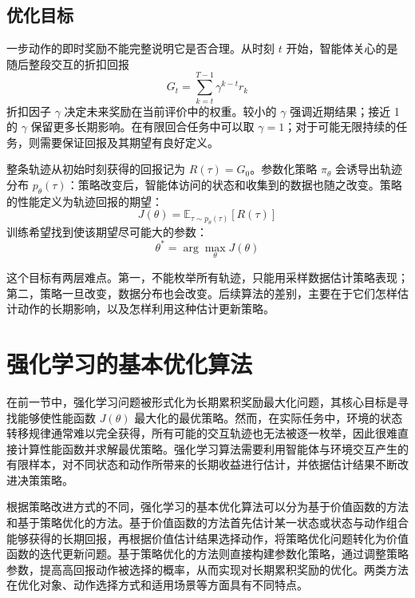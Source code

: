 \subsection{优化目标}

一步动作的即时奖励不能完整说明它是否合理。从时刻 \(t\) 开始，智能体关心的是随后整段交互的折扣回报
\begin{equation}
G_t=\sum_{k=t}^{T-1}\gamma^{k-t}r_k
\end{equation}
折扣因子 \(\gamma\) 决定未来奖励在当前评价中的权重。较小的 \(\gamma\) 强调近期结果；接近 1 的 \(\gamma\) 保留更多长期影响。在有限回合任务中可以取 \(\gamma=1\)；对于可能无限持续的任务，则需要保证回报及其期望有良好定义。

整条轨迹从初始时刻获得的回报记为 \(R(\tau)=G_0\)。参数化策略 \(\pi_\theta\) 会诱导出轨迹分布 \(p_\theta(\tau)\)：策略改变后，智能体访问的状态和收集到的数据也随之改变。策略的性能定义为轨迹回报的期望：
\begin{equation}
J(\theta)
=
\mathbb{E}_{\tau\sim p_\theta(\tau)}[R(\tau)]
\end{equation}
训练希望找到使该期望尽可能大的参数：
\begin{equation}
\theta^{*} = \arg\max_{\theta} J(\theta)
\end{equation}

这个目标有两层难点。第一，不能枚举所有轨迹，只能用采样数据估计策略表现；第二，策略一旦改变，数据分布也会改变。后续算法的差别，主要在于它们怎样估计动作的长期影响，以及怎样利用这种估计更新策略。

\section{强化学习的基本优化算法}
在前一节中，强化学习问题被形式化为长期累积奖励最大化问题，其核心目标是寻找能够使性能函数 $J(\theta)$ 最大化的最优策略。然而，在实际任务中，环境的状态转移规律通常难以完全获得，所有可能的交互轨迹也无法被逐一枚举，因此很难直接计算性能函数并求解最优策略。强化学习算法需要利用智能体与环境交互产生的有限样本，对不同状态和动作所带来的长期收益进行估计，并依据估计结果不断改进决策策略。

根据策略改进方式的不同，强化学习的基本优化算法可以分为基于价值函数的方法和基于策略优化的方法。基于价值函数的方法首先估计某一状态或状态与动作组合能够获得的长期回报，再根据价值估计结果选择动作，将策略优化问题转化为价值函数的迭代更新问题。基于策略优化的方法则直接构建参数化策略，通过调整策略参数，提高高回报动作被选择的概率，从而实现对长期累积奖励的优化。两类方法在优化对象、动作选择方式和适用场景等方面具有不同特点。

